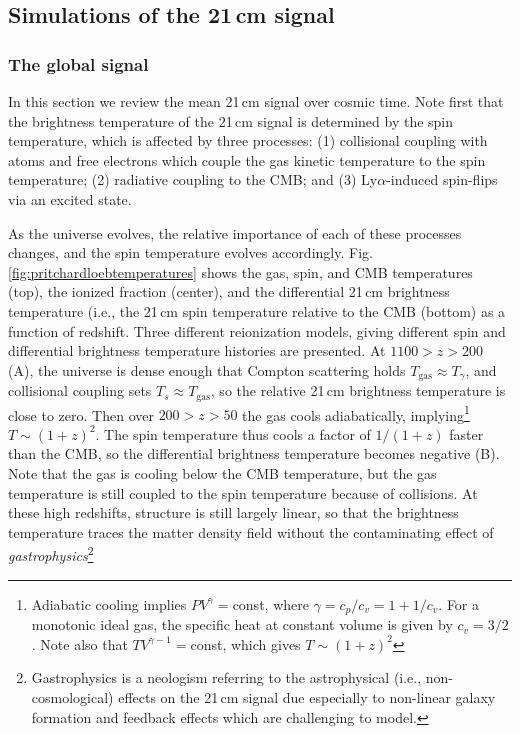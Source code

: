 {\subsection{Simulations of the 21\,cm signal}
\subsubsection{The global signal}
\label{sec:globalsignal}

In this section we review the mean 21\,cm signal over cosmic time. Note first that the brightness temperature of the 21\,cm signal is determined by the spin temperature, which is affected by three processes: (1) collisional coupling with atoms and free electrons which couple the gas kinetic temperature to the spin temperature; (2)  radiative coupling to the CMB; and (3) Ly$\alpha$-induced spin-flips via an excited state. 

As the universe evolves, the relative importance of each of these processes changes, and the spin temperature evolves accordingly. Fig. \ref{fig:pritchardloebtemperatures} shows the gas, spin, and CMB temperatures (top), the ionized fraction (center), and the differential 21\,cm brightness temperature (i.e., the 21\,cm spin temperature relative to the CMB (bottom) as a function of redshift. Three different reionization models, giving different spin and differential brightness temperature histories are presented. At $1100>z>200$ (A), the universe is dense enough that Compton scattering holds $T_\text{gas}\approx T_\gamma$, and collisional coupling sets $T_s\approx T_\text{gas}$, so the relative 21\,cm brightness temperature is close to zero. Then over $200>z>50$ the gas cools adiabatically, implying\footnote{Adiabatic cooling implies $PV^\gamma=$const, where $\gamma=c_p/c_v=1+1/c_v$. For a monotonic ideal gas, the specific heat at constant volume is given by $c_v=3/2$. Note also that $TV^{\gamma-1}=$const, which gives $T\sim (1+z)^2$} $T\sim (1+z)^2$. The spin temperature thus cools a factor of $1/(1+z)$ faster than the CMB, so the differential brightness temperature becomes negative (B). Note that the gas is cooling below the CMB temperature, but the gas temperature is still coupled to the spin temperature because of collisions. At these high redshifts, structure is still largely linear, so that the brightness temperature traces the matter density field without the contaminating effect of \textit{gastrophysics}\footnote{Gastrophysics is a neologism referring to the astrophysical (i.e., non-cosmological) effects on the 21\,cm signal due especially to non-linear galaxy formation and feedback effects which are challenging to model.} 

}
